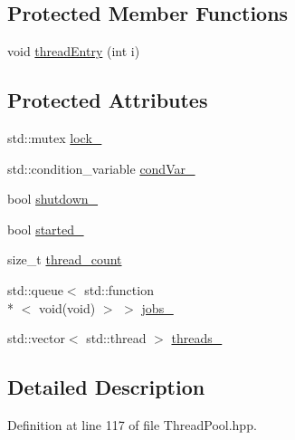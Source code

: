 \subsection*{Protected Member Functions}
\begin{DoxyCompactItemize}
\item 
void \hyperlink{classmas_1_1_thread_pool_ac835204fe6727182c09c9660df5d0d04}{thread\-Entry} (int i)
\end{DoxyCompactItemize}
\subsection*{Protected Attributes}
\begin{DoxyCompactItemize}
\item 
std\-::mutex \hyperlink{classmas_1_1_thread_pool_aa5731410511500215316dfcb867da937}{lock\-\_\-}
\item 
std\-::condition\-\_\-variable \hyperlink{classmas_1_1_thread_pool_a8a0ba497a334ca9107c1925bbb380fbe}{cond\-Var\-\_\-}
\item 
bool \hyperlink{classmas_1_1_thread_pool_acfad0274ea87fdb8a308f1797375401b}{shutdown\-\_\-}
\item 
bool \hyperlink{classmas_1_1_thread_pool_ade7e910b5ff594a59eac9e351dda8ccb}{started\-\_\-}
\item 
size\-\_\-t \hyperlink{classmas_1_1_thread_pool_a5cd471f0c5c9457b42d76d0b84bea21e}{thread\-\_\-count}
\item 
std\-::queue$<$ std\-::function\\*
$<$ void(void) $>$ $>$ \hyperlink{classmas_1_1_thread_pool_a650277a4bb117f7edc7230709d3af937}{jobs\-\_\-}
\item 
std\-::vector$<$ std\-::thread $>$ \hyperlink{classmas_1_1_thread_pool_ae3f3ad42c9e80519e504f7d8f11f6be1}{threads\-\_\-}
\end{DoxyCompactItemize}


\subsection{Detailed Description}


Definition at line 117 of file Thread\-Pool.\-hpp.



